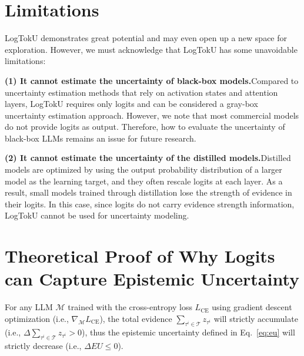 \section{Limitations}

LogTokU demonstrates great potential and may even open up a new space for exploration. However, we must acknowledge that LogTokU has some unavoidable limitations:

\textbf{(1) It cannot estimate the uncertainty of black-box models.}\quad Compared to uncertainty estimation methods that rely on activation states and attention layers, LogTokU requires only logits and can be considered a gray-box uncertainty estimation approach. However, we note that most commercial models do not provide logits as output. Therefore, how to evaluate the uncertainty of black-box LLMs remains an issue for future research.

\textbf{(2) It cannot estimate the uncertainty of the distilled models.}\quad  Distilled models are optimized by using the output probability distribution of a larger model as the learning target, and they often rescale logits at each layer. As a result, small models trained through distillation lose the strength of evidence in their logits. In this case, since logits do not carry evidence strength information, LogTokU cannot be used for uncertainty modeling.

\clearpage

\section{Theoretical Proof of Why Logits can Capture Epistemic Uncertainty}

\begin{tcolorbox}[colback=gray!10,%
                  colframe=black,%
                  width=\linewidth,%
                  arc=1mm, auto outer arc,
                  boxrule=0.5pt,
                 ]
\begin{theorem}
For any LLM \(\mathcal{M}\) trained with the cross-entropy loss \(L_{\text{CE}}\) using gradient descent optimization (i.e., \(\nabla_\mathcal{M} L_{\text{CE}}\)), the total evidence \( \sum_{\tau^i \in \mathcal{T}} z_{\tau^i} \) will strictly accumulate (i.e., \( \Delta\sum_{\tau^i \in \mathcal{T}} z_{\tau^i}>0 \)), thus the epistemic uncertainty defined in Eq.~\ref{eq:eu} will strictly decrease (i.e., \( \Delta EU \leq 0 \)).
\label{thm:main}
\end{theorem}
\end{tcolorbox}


